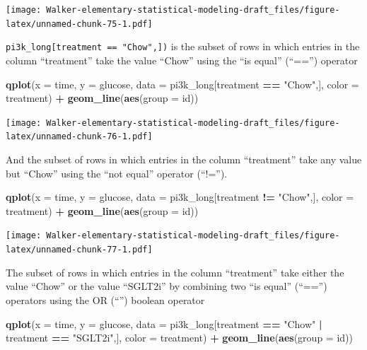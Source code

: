 \documentclass[]{book}
\newenvironment{Shaded}{\begin{snugshade}}{\end{snugshade}}
\newcommand{\DataTypeTok}[1]{\textcolor[rgb]{0.13,0.29,0.53}{#1}}
\newcommand{\KeywordTok}[1]{\textcolor[rgb]{0.13,0.29,0.53}{\textbf{#1}}}
\newcommand{\NormalTok}[1]{#1}
\newcommand{\OperatorTok}[1]{\textcolor[rgb]{0.81,0.36,0.00}{\textbf{#1}}}
\newcommand{\StringTok}[1]{\textcolor[rgb]{0.31,0.60,0.02}{#1}}
\begin{document}
\texttt{[image: Walker-elementary-statistical-modeling-draft\_files/figure-latex/unnamed-chunk-75-1.pdf]}

\texttt{pi3k\_long{[}treatment\ ==\ "Chow",{]})} is the subset of rows in which entries in the column ``treatment'' take the value ``Chow'' using the ``is equal'' (``=='') operator

\begin{Shaded}
\begin{Highlighting}[]
\KeywordTok{qplot}\NormalTok{(}\DataTypeTok{x =}\NormalTok{ time,}
      \DataTypeTok{y =}\NormalTok{ glucose,}
      \DataTypeTok{data =}\NormalTok{ pi3k_long[treatment }\OperatorTok{==}\StringTok{ "Chow"}\NormalTok{,],}
      \DataTypeTok{color =}\NormalTok{ treatment) }\OperatorTok{+}
\StringTok{  }\KeywordTok{geom_line}\NormalTok{(}\KeywordTok{aes}\NormalTok{(}\DataTypeTok{group =}\NormalTok{ id))}
\end{Highlighting}
\end{Shaded}

\texttt{[image: Walker-elementary-statistical-modeling-draft\_files/figure-latex/unnamed-chunk-76-1.pdf]}

And the subset of rows in which entries in the column ``treatment'' take any value but ``Chow'' using the ``not equal'' operator (``!='').

\begin{Shaded}
\begin{Highlighting}[]
\KeywordTok{qplot}\NormalTok{(}\DataTypeTok{x =}\NormalTok{ time,}
      \DataTypeTok{y =}\NormalTok{ glucose,}
      \DataTypeTok{data =}\NormalTok{ pi3k_long[treatment }\OperatorTok{!=}\StringTok{ "Chow"}\NormalTok{,],}
      \DataTypeTok{color =}\NormalTok{ treatment) }\OperatorTok{+}
\StringTok{  }\KeywordTok{geom_line}\NormalTok{(}\KeywordTok{aes}\NormalTok{(}\DataTypeTok{group =}\NormalTok{ id))}
\end{Highlighting}
\end{Shaded}

\texttt{[image: Walker-elementary-statistical-modeling-draft\_files/figure-latex/unnamed-chunk-77-1.pdf]}

The subset of rows in which entries in the column ``treatment'' take either the value ``Chow'' or the value ``SGLT2i'' by combining two ``is equal'' (``=='') operators using the OR (``\textbar{}'') boolean operator

\begin{Shaded}
\begin{Highlighting}[]
\KeywordTok{qplot}\NormalTok{(}\DataTypeTok{x =}\NormalTok{ time,}
      \DataTypeTok{y =}\NormalTok{ glucose,}
      \DataTypeTok{data =}\NormalTok{ pi3k_long[treatment }\OperatorTok{==}\StringTok{ "Chow"} \OperatorTok{|}\StringTok{ }\NormalTok{treatment }\OperatorTok{==}\StringTok{ "SGLT2i"}\NormalTok{,],}
      \DataTypeTok{color =}\NormalTok{ treatment) }\OperatorTok{+}
\StringTok{  }\KeywordTok{geom_line}\NormalTok{(}\KeywordTok{aes}\NormalTok{(}\DataTypeTok{group =}\NormalTok{ id))}
\end{Highlighting}
\end{Shaded}
\end{document}
